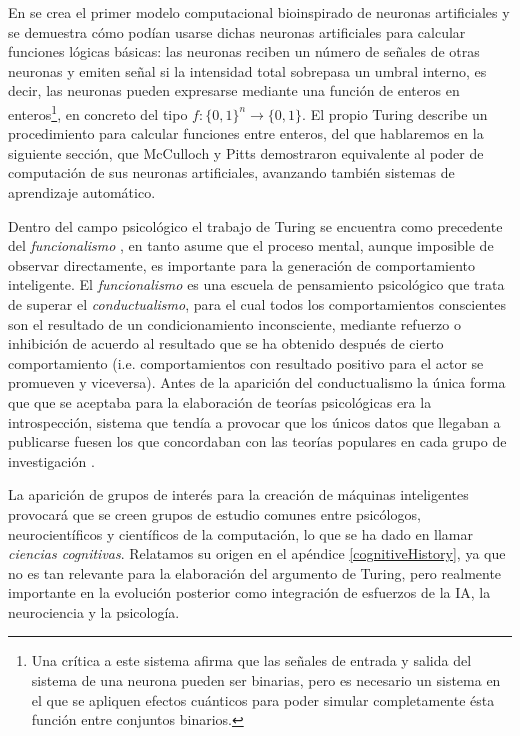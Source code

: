 \documentclass[12pt]{memoir}
\begin{document}
En \parencite{mcCullochPitts} se crea el primer modelo computacional bioinspirado de neuronas artificiales  y se demuestra cómo podían usarse dichas neuronas artificiales para calcular funciones lógicas básicas: las neuronas reciben un número de señales de otras neuronas y emiten señal si la intensidad total sobrepasa un umbral interno, es decir, las neuronas pueden expresarse mediante una función de enteros en enteros\footnote{Una crítica a este sistema \parencite{newmind} afirma que las señales de entrada y salida del sistema de una neurona pueden ser binarias, pero es necesario un sistema en el que se apliquen efectos cuánticos para poder simular completamente ésta función entre conjuntos binarios.}, en concreto del tipo $f: \lbrace 0, 1\rbrace^n \rightarrow \lbrace 0, 1\rbrace$. El propio Turing \parencite{turingComputableNumbers} describe un procedimiento para calcular funciones entre enteros, del que hablaremos en la siguiente sección, que McCulloch y Pitts demostraron equivalente al poder de computación de sus neuronas artificiales, avanzando también sistemas de aprendizaje automático.

Dentro del campo psicológico el trabajo de Turing se encuentra como precedente del \textit{funcionalismo} \parencite{sep-functionalism}, en tanto asume que el proceso mental, aunque imposible de observar directamente, es importante para la generación de comportamiento inteligente. El \textit{funcionalismo} es una escuela de pensamiento psicológico que trata de superar el \textit{conductualismo}, para el cual todos los comportamientos conscientes son el resultado de un condicionamiento inconsciente, mediante refuerzo o inhibición de acuerdo al resultado que se ha obtenido después de cierto comportamiento (i.e. comportamientos con resultado positivo para el actor se promueven y viceversa). Antes de la aparición del conductualismo la única forma que que se aceptaba para la elaboración de teorías psicológicas era la introspección, sistema que tendía a provocar que los únicos datos que llegaban a publicarse fuesen los que concordaban con las teorías populares en cada grupo de investigación \parencite[p.13]{modernAI}.

La aparición de grupos de interés para la creación de máquinas inteligentes provocará que se creen grupos de estudio comunes entre psicólogos, neurocientíficos y científicos de la computación, lo que se ha dado en llamar \textit{ciencias cognitivas}. Relatamos su origen en el apéndice \ref{cognitiveHistory}, ya que no es tan relevante para la elaboración del argumento de Turing, pero realmente importante en la evolución posterior como integración de esfuerzos de la IA, la neurociencia y la psicología.
\end{document}
